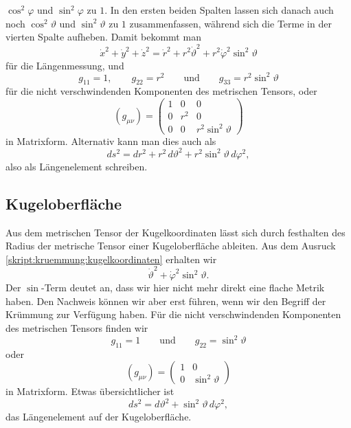 $\cos^2\varphi$ und $\sin^2\varphi$ zu $1$.
In den ersten beiden Spalten lassen sich danach auch noch
$\cos^2\vartheta$ und $\sin^2\vartheta$ zu $1$ zusammenfassen,
während sich die Terme in der vierten Spalte aufheben.
Damit bekommt man
\begin{equation}
\dot x^2 + \dot y^2 + \dot z^2
=
\dot r^2+r^2\dot\vartheta^2 + r^2\dot\varphi^2\sin^2\vartheta
\label{skript:kruemmung:kugelkoordinaten}
\end{equation}
für die Längenmessung, und
\[
g_{11}=1,\qquad
g_{22}=r^2
\qquad\text{und}\qquad
g_{33}= r^2\sin^2\vartheta
\]
für die nicht verschwindenden Komponenten des metrischen Tensors,
oder
\[
(g_{\mu\nu})
=
\begin{pmatrix}
1&  0&       0          \\
0&r^2&       0          \\
0&  0&r^2\sin^2\vartheta
\end{pmatrix}
\]
in Matrixform.
Alternativ kann man dies auch als
\begin{equation}
ds^2
=
dr^2 + r^2\,d\vartheta^2 + r^2\sin^2\vartheta\,d\varphi^2,
\label{skript:laengenmessung:kugelkoordinaten}
\end{equation}
also als Längenelement schreiben.
%

\subsection{Kugeloberfläche}
Aus dem metrischen Tensor der Kugelkoordinaten lässt sich durch festhalten
des Radius der metrische Tensor einer Kugeloberfläche ableiten.
Aus dem Ausruck \eqref{skript:kruemmung:kugelkoordinaten}
erhalten wir
\[
\dot\vartheta^2+\dot\varphi^2\sin^2\vartheta.
\]
Der $\sin$-Term deutet an, dass wir hier nicht mehr direkt eine flache
Metrik haben.
Den Nachweis können wir aber erst führen, wenn wir den Begriff der
Krümmung zur Verfügung haben.
Für die nicht verschwindenden Komponenten des metrischen Tensors
finden wir
\[
g_{11} = 1
\qquad\text{und}\qquad
g_{22}=\sin^2\vartheta
\]
oder
\[
(g_{\mu\nu})
=
\begin{pmatrix}
1&0\\
0&\sin^2\vartheta
\end{pmatrix}
\]
in Matrixform.
Etwas übersichtlicher ist 
\begin{equation}
ds^2
=
d\vartheta^2 + \sin^2\vartheta\,d\varphi^2,
\label{skript:laengenmessung:kugeloberflaeche}
\end{equation}
das Längenelement auf der Kugeloberfläche.
%

